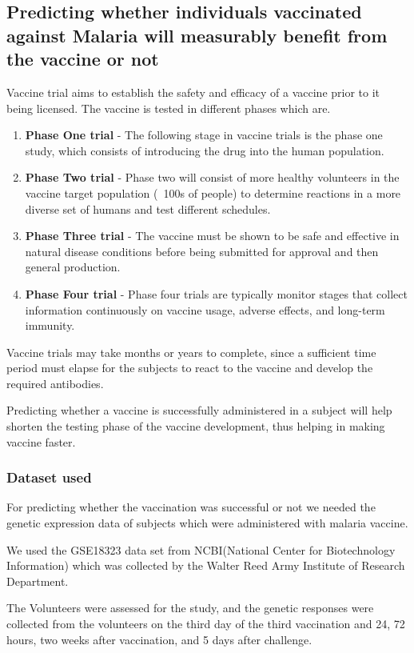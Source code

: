\documentclass[notitlepage]{article}
\begin{document}
		\subsection{Predicting whether individuals vaccinated against Malaria will measurably benefit from the vaccine or not}
		Vaccine trial aims to establish the safety and efficacy of a vaccine prior to it being licensed. The vaccine is tested in different phases which are.
		\begin{enumerate}
			\item \textbf{Phase One trial} - The following stage in vaccine trials is the phase one study, which consists of introducing the drug into the human population.
			\item \textbf{Phase Two trial} - Phase two will consist of more healthy volunteers in the vaccine target population (~100s of people) to determine reactions in a more diverse set of humans and test different schedules.
			\item \textbf{Phase Three trial} - The vaccine must be shown to be safe and effective in natural disease conditions before being submitted for approval and then general production.
			\item \textbf{Phase Four trial} - Phase four trials are typically monitor stages that collect information continuously on vaccine usage, adverse effects, and long-term immunity.\cite{item1}
		\end{enumerate}
	
	Vaccine trials may take months or years to complete, since a sufficient time period must elapse for the subjects to react to the vaccine and develop the required antibodies. 
	
	Predicting whether a vaccine is successfully administered in a subject will help shorten the testing phase of the vaccine development, thus helping in making vaccine faster.
	
	\subsubsection{Dataset used}
	For predicting whether the vaccination was successful or not we needed the genetic expression data of subjects which were administered with malaria vaccine.
	
	We used the GSE18323 data set from NCBI(National Center for Biotechnology Information) which was collected by the Walter Reed Army Institute of Research
	Department.
	
	The Volunteers were assessed for the study, and the genetic responses were collected from the volunteers on the third day of the third vaccination and 24, 72 hours, two weeks after vaccination, and 5 days after challenge.\cite{item2}
	
\end{document}
